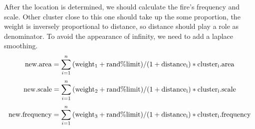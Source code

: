\documentclass{mcmthesis}
\begin{document}
After the location is determined, we should calculate the fire’s frequency and scale. Other  cluster close to this one should take up the some proportion, the weight is inversely proportional to distance, so distance should play a role as denominator. To avoid the appearance of inﬁnity, we need to add a laplace smoothing.
\begin{equation}
	{\rm new.area} = \sum_{i=1}^n {\rm (weight_1+rand\%limit)/(1+distance_i)*cluster_i.area}
\end{equation}
\begin{equation}
	{\rm new.scale} = \sum_{i=1}^n {\rm (weight_2+rand\%limit)/(1+distance_i)*cluster_i.scale}
\end{equation}
\begin{equation}
	{\rm new.frequency} = \sum_{i=1}^n {\rm (weight_3+rand\%limit)/(1+distance_i)*cluster_i.frequency}
\end{equation}
\end{document}

